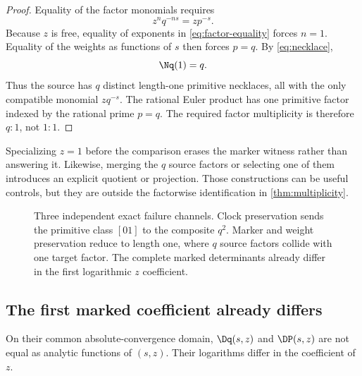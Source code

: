 \begin{proof}
Equality of the factor monomials requires
\begin{equation}
 z^nq^{-ns}=zp^{-s}.                                         \label{eq:factor-equality}
\end{equation}
Because $z$ is free, equality of exponents in \cref{eq:factor-equality}
forces $n=1$. Equality of the weights as functions of $s$ then forces $p=q$.
By \cref{eq:necklace},
\[
 \Nq(1)=q.
\]
Thus the source has $q$ distinct length-one primitive necklaces, all with the
only compatible monomial $zq^{-s}$. The rational Euler product has one
primitive factor indexed by the rational prime $p=q$. The required factor
multiplicity is therefore $q:1$, not $1:1$.
\end{proof}

Specializing $z=1$ before the comparison erases the marker witness rather
than answering it. Likewise, merging the $q$ source factors or selecting one
of them introduces an explicit quotient or projection. Those constructions
can be useful controls, but they are outside the factorwise identification in
\cref{thm:multiplicity}.

\begin{figure}[t]
  \centering
  \resizebox{\textwidth}{!}{}
  \caption{Three independent exact failure channels. Clock preservation sends
  the primitive class $[01]$ to the composite $q^2$. Marker and weight
  preservation reduce to length one, where $q$ source factors collide with
  one target factor. The complete marked determinants already differ in the
  first logarithmic $z$ coefficient.}
  \label{fig:three-obstructions}
\end{figure}

\subsection{The first marked coefficient already differs}

\begin{theorem}
\label{thm:coefficient}
On their common absolute-convergence domain, $\Dq(s,z)$ and $\DP(s,z)$ are
not equal as analytic functions of $(s,z)$. Their logarithms differ in the
coefficient of $z$.
\end{theorem}

